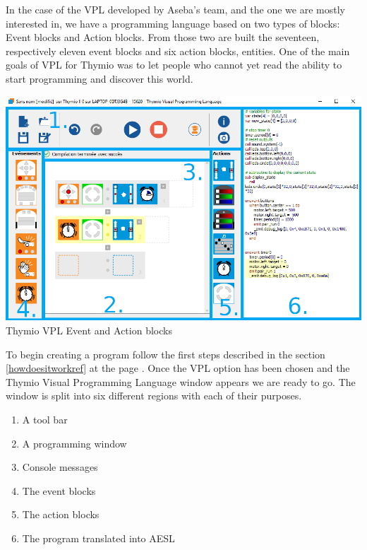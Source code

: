 \documentclass{scrbook}
\begin{document}
In the case of the VPL developed by Aseba’s team, and the one we are mostly interested in, we have a programming language based on two types of blocks: Event blocks and Action blocks. 
From those two are built the seventeen, respectively eleven event blocks and six action blocks, entities. 
One of the main goals of VPL for Thymio was to let people who cannot yet read the ability to start programming and discover this world.\\

\begin{center}
  \includegraphics[width=\textwidth]{./VPL/Thymio_VPL_window}\\
  Thymio VPL Event and Action blocks
\end{center}

To begin creating a program follow the first steps described in the section \ref{howdoesitworkref} at the page \pageref{howdoesitworkref}. 
Once the VPL option has been chosen and the Thymio Visual Programming Language window appears we are ready to go. 
The window is split into six different regions with each of their purposes.
\begin{enumerate}
  \item A tool bar
  \item A programming window
  \item Console messages
  \item The event blocks
  \item The action blocks
  \item The program translated into AESL
\end{enumerate}
\end{document}
